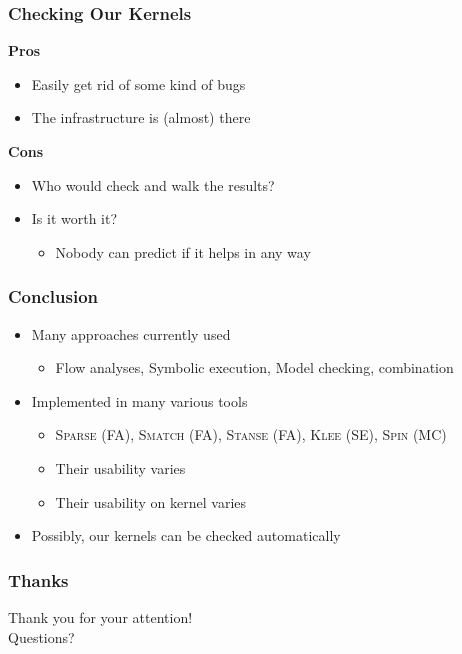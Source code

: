 \documentclass[handout,xcolor=dvipsnames]{beamer}
\newcommand{\heading}[1]{\textbf{\textcolor{BurntOrange}{#1}}}
\begin{document}
\begin{frame}
  \frametitle{Checking Our Kernels}
  \heading{Pros}
  \begin{itemize}
  \item Easily get rid of some kind of bugs
  \item The infrastructure is (almost) there
  \end{itemize} \pause
  \heading{Cons}
  \begin{itemize}
  \item Who would check and walk the results?
  \item Is it worth it?
  \begin{itemize}
  \item Nobody can predict if it helps in any way
  \end{itemize}
  \end{itemize}

\end{frame}

\begin{frame}
  \frametitle{Conclusion}
  \begin{itemize}
  \item Many approaches currently used
  \begin{itemize}
  \item Flow analyses, Symbolic execution, Model checking, combination
  \end{itemize}
  \item Implemented in many various tools
  \begin{itemize}
  \item \textsc{Sparse} (FA), \textsc{Smatch} (FA), \textsc{Stanse} (FA),
  \textsc{Klee} (SE), \textsc{Spin} (MC)
  \item Their usability varies
  \item Their usability on kernel varies
  \end{itemize}
  \item Possibly, our kernels can be checked automatically
  \end{itemize}

\end{frame}

\begin{frame}
  \frametitle{Thanks}
  \begin{center} \LARGE
  Thank you for your attention! \\[2.5em]
  Questions?
  \end{center}

\end{frame}
\end{document}
